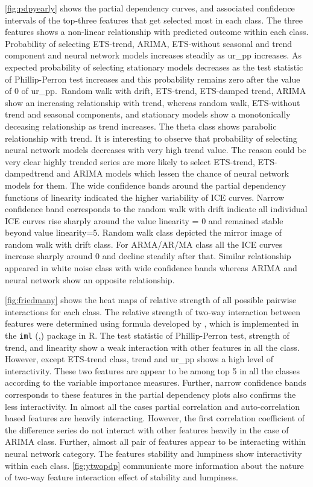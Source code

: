 \documentclass[11pt,a4paper,]{article}
\begin{document}
\autoref{fig:pdpyearly} shows the partial dependency curves, and
associated confidence intervals of the top-three features that get
selected most in each class. The three features shows a non-linear
relationship with predicted outcome within each class. Probability of
selecting ETS-trend, ARIMA, ETS-without seasonal and trend component and
neural network models increases steadily as ur\_pp increases. As
expected probability of selecting stationary models decreases as the
test statistic of Phillip-Perron test increases and this probability
remains zero after the value of 0 of ur\_pp.~Random walk with drift,
ETS-trend, ETS-damped trend, ARIMA show an increasing relationship with
trend, whereas random walk, ETS-without trend and seasonal components,
and stationary models show a monotonically deceasing relationship as
trend increases. The theta class shows parabolic relationship with
trend. It is interesting to observe that probability of selecting neural
network models decreases with very high trend value. The reason could be
very clear highly trended series are more likely to select ETS-trend,
ETS-dampedtrend and ARIMA models which lessen the chance of neural
network models for them. The wide confidence bands around the partial
dependency functions of linearity indicated the higher variability of
ICE curves. Narrow confidence band corresponds to the random walk with
drift indicate all individual ICE curves rise sharply around the value
linearity = 0 and remained stable beyond value linearity=5. Random walk
class depicted the mirror image of random walk with drift class. For
ARMA/AR/MA class all the ICE curves increase sharply around 0 and
decline steadily after that. Similar relationship appeared in white
noise class with wide confidence bands whereas ARIMA and neural network
show an opposite relationship.

\autoref{fig:friedmany} shows the heat maps of relative strength of all
possible pairwise interactions for each class. The relative strength of
two-way interaction between features were determined using formula
developed by \textcite{friedman2008predictive}, which is implemented in
the \texttt{iml} (\textcite{molnar2018iml},) package in R. The test
statistic of Phillip-Perron test, strength of trend, and linearity show
a weak interaction with other features in all the class. However, except
ETS-trend class, trend and ur\_pp shows a high level of interactivity.
These two features are appear to be among top 5 in all the classes
according to the variable importance measures. Further, narrow
confidence bands corresponds to these features in the partial dependency
plots also confirms the less interactivity. In almost all the cases
partial correlation and auto-correlation based features are heavily
interacting. However, the first correlation coefficient of the
difference series do not interact with other features heavily in the
case of ARIMA class. Further, almost all pair of features appear to be
interacting within neural network category. The features stability and
lumpiness show interactivity within each class. \autoref{fig:ytwopdp}
communicate more information about the nature of two-way feature
interaction effect of stability and lumpiness.
\end{document}
